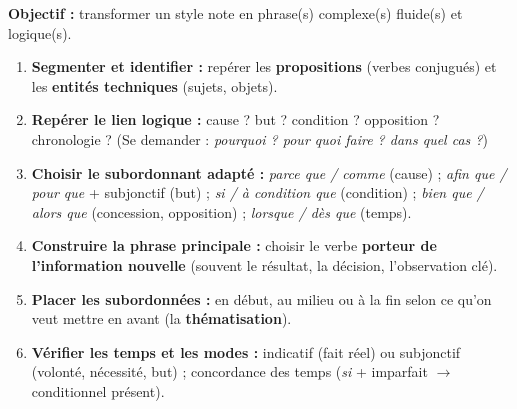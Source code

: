 \documentclass[11pt]{article}
\begin{document}
\begin{methode}
\textbf{Objectif :} transformer un \og{}style note\fg{} en phrase(s) complexe(s) fluide(s) et logique(s).
\begin{enumerate}
    \item \textbf{Segmenter et identifier :} repérer les \textbf{propositions} (verbes conjugués) et les \textbf{entités techniques} (sujets, objets).
    \item \textbf{Repérer le lien logique :} cause ? but ? condition ? opposition ? chronologie ? (Se demander : \textit{pourquoi ? pour quoi faire ? dans quel cas ?})
    \item \textbf{Choisir le subordonnant adapté :} \textit{parce que / comme} (cause) ; \textit{afin que / pour que} + subjonctif (but) ; \textit{si / à condition que} (condition) ; \textit{bien que / alors que} (concession, opposition) ; \textit{lorsque / dès que} (temps).
    \item \textbf{Construire la phrase principale :} choisir le verbe \textbf{porteur de l'information nouvelle} (souvent le résultat, la décision, l'observation clé).
    \item \textbf{Placer les subordonnées :} en début, au milieu ou à la fin selon ce qu'on veut mettre en avant (la \textbf{thématisation}).
    \item \textbf{Vérifier les temps et les modes :} indicatif (fait réel) ou subjonctif (volonté, nécessité, but) ; concordance des temps (\textit{si} + imparfait $\rightarrow$ conditionnel présent).
\end{enumerate}
\end{methode}
\end{document}

